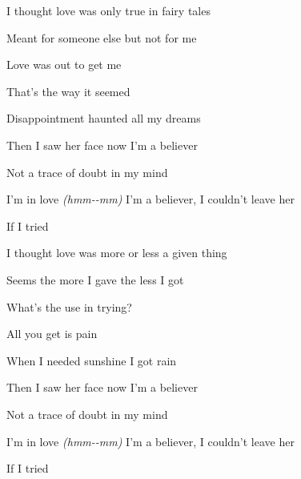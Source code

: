 \begin{song}


\begin{hchordbox}
\end{hchordbox}

\bigskip

I thought love was only true in fairy tales  \par
{}Meant for someone else but not for me \par
{} Love was out to get me  \par
{} That's the way it seemed  \par
{} Disappointment haunted all my dreams  \par

\bigskip

Then I saw her face   now I'm a believer   \par
Not a trace   of doubt in my mind   \par
I'm in love \textit{(hmm-}\textit{-mm)} I'm a believer, I couldn't leave her \par
If I tried \par

\bigskip

I thought love was more or less a given thing \par
{}Seems the more I gave the less I got \par
{}What's the use in trying?  \par
{} All you get is pain  \par
{} When I needed sunshine I got rain  \par

\bigskip

Then I saw her face   now I'm a believer   \par
Not a trace   of doubt in my mind   \par
I'm in love \textit{(hmm-}\textit{-mm)} I'm a believer, I couldn't leave her \par
If I tried \par


\end{song}
